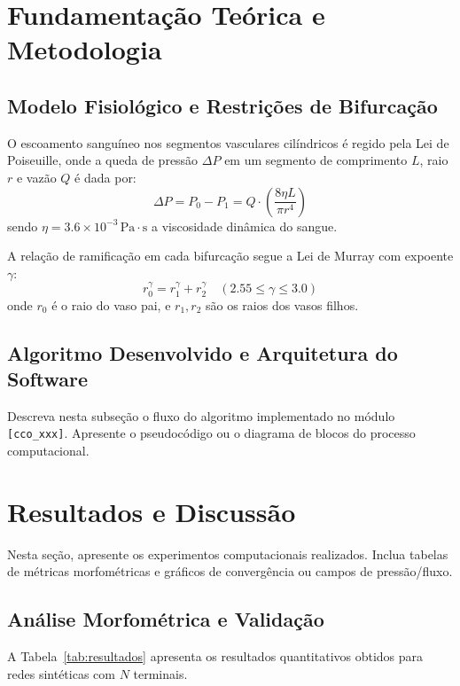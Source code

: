 \documentclass[11pt, a4paper]{article}
\begin{document}
\section{Fundamentação Teórica e Metodologia}

\subsection{Modelo Fisiológico e Restrições de Bifurcação}
O escoamento sanguíneo nos segmentos vasculares cilíndricos é regido pela Lei de Poiseuille, onde a queda de pressão $\Delta P$ em um segmento de comprimento $L$, raio $r$ e vazão $Q$ é dada por:
\begin{equation}
  \Delta P = P_0 - P_1 = Q \cdot \left( \frac{8 \eta L}{\pi r^4} \right)
  \label{eq:poiseuille}
\end{equation}
sendo $\eta = 3.6 \times 10^{-3}\,\text{Pa}\cdot\text{s}$ a viscosidade dinâmica do sangue.

A relação de ramificação em cada bifurcação segue a Lei de Murray com expoente $\gamma$:
\begin{equation}
  r_0^\gamma = r_1^\gamma + r_2^\gamma \quad (2.55 \le \gamma \le 3.0)
  \label{eq:murray}
\end{equation}
onde $r_0$ é o raio do vaso pai, e $r_1, r_2$ são os raios dos vasos filhos.

\subsection{Algoritmo Desenvolvido e Arquitetura do Software}
Descreva nesta subseção o fluxo do algoritmo implementado no módulo \texttt{[cco\_xxx]}. Apresente o pseudocódigo ou o diagrama de blocos do processo computacional.

\section{Resultados e Discussão}
Nesta seção, apresente os experimentos computacionais realizados. Inclua tabelas de métricas morfométricas e gráficos de convergência ou campos de pressão/fluxo.

\subsection{Análise Morfométrica e Validação}
A Tabela~\ref{tab:resultados} apresenta os resultados quantitativos obtidos para redes sintéticas com $N$ terminais.
\end{document}
